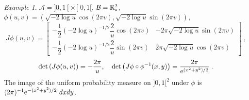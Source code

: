 \documentclass[12pt,a4paper]{amsart}
\theoremstyle{plain}%
\theoremstyle{definition}
\theoremstyle{remark}
\newtheorem{example}{Example}
\begin{document}
\begin{example}
  $\mathcal A = ]0,1[\times ]0,1[$, $\mathcal B = \mathbb{R}^2_*$, $\phi(u,v)=(\sqrt{-2\log u}\cos(2\pi v),\sqrt{-2\log u}\sin(2\pi v))$,
\begin{equation*}
  J\phi(u,v) =
  \begin{bmatrix}
    - \dfrac12 (-2 \log u)^{-1/2} \dfrac {2}{u} \cos(2\pi v) & - 2\pi \sqrt{- 2\log u} \sin(2\pi v) \\ - \dfrac12 (-2 \log u)^{-1/2} \dfrac {2}{u} \sin(2\pi v) & 2\pi \sqrt{-2\log u} \cos(2\pi v)
  \end{bmatrix} \ ,
\end{equation*}
\begin{equation*}
  \detof{J\phi(u,v)} = - \frac {2\pi}{u}, \quad \detof{J\phi\circ\phi^{-1}(x,y)} = \frac{2\pi}{\euler^{(x^2+y^2)/2}} \ .
\end{equation*}
The image of the uniform probability measure on $]0,1[^2$ under $\phi$ is $(2\pi)^{-1} \euler^{-(x^2+y^2)/2} \ dxdy$.
\end{example}
\end{document}
